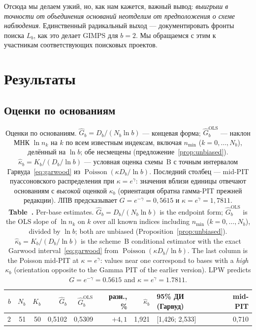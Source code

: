 \documentclass[11pt,a4paper]{article}
\newcommand{\encaptab}[1]{\\[3pt]\foreignlanguage{english}{%
  \textbf{Table~\thetable.} #1}}
\theoremstyle{plain}
\theoremstyle{remark}
\newcommand{\eg}{e^{\gamma}}
\newcommand{\emg}{e^{-\gamma}}
\DeclareMathOperator{\Pois}{Poisson}
\begin{document}
Отсюда мы делаем узкий, но, как нам кажется, важный вывод: \emph{выигрыш в точности от
объединения оснований неотделим от предположения о схеме наблюдения}.
Единственный радикальный выход --- документировать фронты поиска $L_b$, как это делает
GIMPS для $b=2$. Мы обращаемся с этим к участникам соответствующих поисковых проектов.

\section{Результаты}\label{sec:results}

\subsection{Оценки по основаниям}

\begin{table}[t]
\centering
\caption{Оценки по основаниям. $\hat G_b=D_b/(N_b\ln b)$ --- концевая форма;
$\hat G_b^{\mathrm{OLS}}$ --- наклон МНК $\ln n_k$ на $k$ по всем известным
индексам, включая $n_{\min}$ ($k=0,\dots,N_b$), делённый на $\ln b$; обе
несмещены (предложение~\ref{prop:unbiased}). $\hat\kappa_b=K_b/(D_b/\ln b)$ ---
условная оценка схемы~B с точным интервалом Гарвуда~\eqref{eq:garwood} из
$\Pois(\kappa D_b/\ln b)$. Последний столбец --- mid-PIT пуассоновского
распределения при $\kappa=\eg$: значения вблизи единицы отвечают основаниям с
\emph{высокой} оценкой $\kappa_b$ (ориентация обратна гамма-PIT прежней
редакции). ЛПВ предсказывает $G=\emg=0{,}5615$ и $\kappa=\eg=1{,}7811$.
\encaptab{Per-base estimates. $\hat G_b=D_b/(N_b\ln b)$ is the endpoint form;
$\hat G_b^{\mathrm{OLS}}$ is the OLS slope of $\ln n_k$ on $k$ over all known
indices including $n_{\min}$ ($k=0,\dots,N_b$), divided by $\ln b$;
both are unbiased (Proposition~\ref{prop:unbiased}).
$\hat\kappa_b=K_b/(D_b/\ln b)$ is the scheme~B conditional estimator with the
exact Garwood interval~\eqref{eq:garwood} from $\Pois(\kappa D_b/\ln b)$. The last
column is the Poisson mid-PIT at $\kappa=\eg$: values near one correspond to bases
with a \emph{high} $\kappa_b$ (orientation opposite to the Gamma PIT of the earlier
version). LPW predicts $G=\emg=0.5615$ and $\kappa=\eg=1.7811$.}}
\label{tab:bases}
\small
\begin{tabular}{rrrrrrrl r}
\toprule
$b$ & $N_b$ & $K_b$ & $\hat G_b$ & $\hat G_b^{\mathrm{OLS}}$ & разн., \% &
$\hat\kappa_b$ & 95\% ДИ (Гарвуд) & mid-PIT\\
\midrule
2 & 51 & 50 & 0{,}5102 & 0{,}5309 & $+4{,}1$ & 1{,}921 & [1{,}426; 2{,}533] & 0{,}710\\

\end{tabular}
\end{table}
\end{document}
